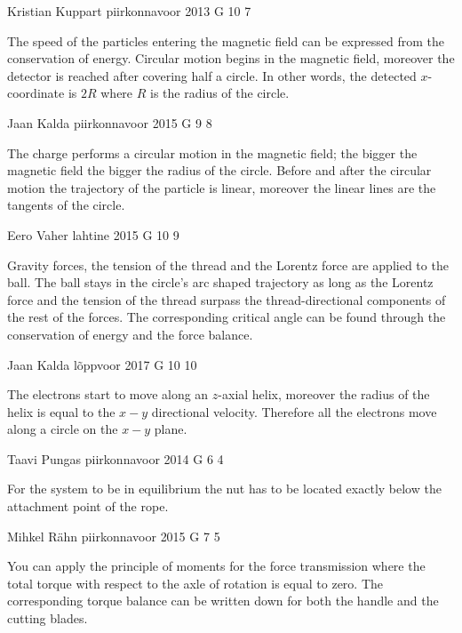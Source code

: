 \documentclass[11pt]{article}
\begin{document}
{Kristian Kuppart} %
{piirkonnavoor} %
{2013} %
{G 10} %
{7} %
{

\ifEngHint
The speed of the particles entering the magnetic field can be expressed from the conservation of energy. Circular motion begins in the magnetic field, moreover the detector is reached after covering half a circle. In other words, the detected $x$-coordinate is $2R$ where $R$ is the radius of the circle.
\fi
}

{Jaan Kalda} %
{piirkonnavoor} %
{2015} %
{G 9} %
{8} %
{

\ifEngHint
The charge performs a circular motion in the magnetic field; the bigger the magnetic field the bigger the radius of the circle. Before and after the circular motion the trajectory of the particle is linear, moreover the linear lines are the tangents of the circle.
\fi
}

{Eero Vaher} %
{lahtine} %
{2015} %
{G 10} %
{9} %
{

\ifEngHint
Gravity forces, the tension of the thread and the Lorentz force are applied to the ball. The ball stays in the circle’s arc shaped trajectory as long as the Lorentz force and the tension of the thread surpass the thread-directional components of the rest of the forces. The corresponding critical angle can be found through the conservation of energy and the force balance.
\fi
}

{Jaan Kalda} %
{lõppvoor} %
{2017} %
{G 10} %
{10} %
{

\ifEngHint
The electrons start to move along an $z$-axial helix, moreover the radius of the helix is equal to the $x-y$ directional velocity. Therefore all the electrons move along a circle on the $x-y$ plane.
\fi
}

{Taavi Pungas} %
{piirkonnavoor} %
{2014} %
{G 6} %
{4} %
{

\ifEngHint
For the system to be in equilibrium the nut has to be located exactly below the attachment point of the rope.
\fi
}

{Mihkel Rähn} %
{piirkonnavoor} %
{2015} %
{G 7} %
{5} %
{

\ifEngHint
You can apply the principle of moments for the force transmission where the total torque with respect to the axle of rotation is equal to zero. The corresponding torque balance can be written down for both the handle and the cutting blades.
\fi
}
\end{document}
